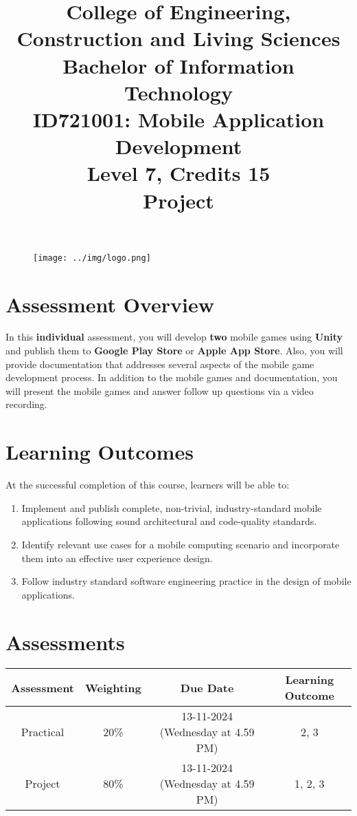 \documentclass{article}
\author{}
\begin{document}
 

\begin{figure}
	\centering
	\texttt{[image: ../img/logo.png]}
\end{figure} 

\title{College of Engineering, Construction and Living Sciences\\Bachelor of Information Technology\\ID721001: Mobile Application Development\\Level 7, Credits 15\\\textbf{Project}}
\date{}
\maketitle

\section*{Assessment Overview}
In this \textbf{individual} assessment, you will develop \textbf{two} mobile games using \textbf{Unity} and publish them to \textbf{Google Play Store} or \textbf{Apple App Store}. Also, you will provide documentation that addresses several aspects of the mobile game development process. In addition to the mobile games and documentation, you will present the mobile games and answer follow up questions via a video recording.

\section*{Learning Outcomes}
At the successful completion of this course, learners will be able to:
\begin{enumerate}
	\item Implement and publish complete, non-trivial, industry-standard mobile applications following sound architectural and code-quality standards.
	\item Identify relevant use cases for a mobile computing scenario and incorporate them into an effective user experience design.
	\item Follow industry standard software engineering practice in the design of mobile applications.
\end{enumerate}

\section*{Assessments}
\renewcommand{\arraystretch}{1.5}
\begin{tabular}{|c|c|c|c|}
	\hline
	\textbf{Assessment}                                 & \textbf{Weighting} & \textbf{Due Date}            & \textbf{Learning Outcome} \\ \hline
	\small Practical & \small 20\%        & \small 13-11-2024 (Wednesday at 4.59 PM)   & \small 2, 3                   \\ \hline
	\small Project                 & \small 80\%        & \small 13-11-2024 (Wednesday at 4.59 PM) \small  & \small 1, 2, 3                   \\ \hline
\end{tabular}
\end{document}
